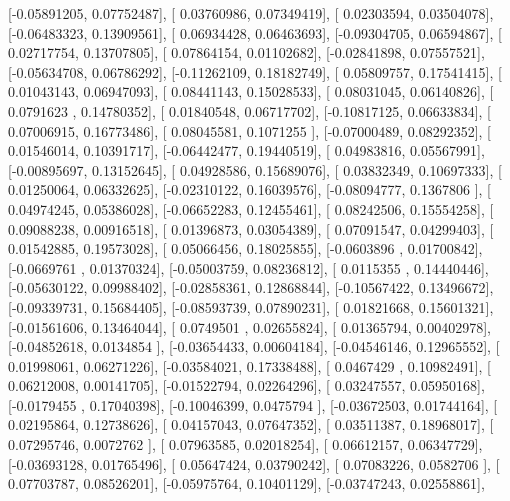 \documentclass{article}
\begin{document}
       [-0.05891205,  0.07752487],
       [ 0.03760986,  0.07349419],
       [ 0.02303594,  0.03504078],
       [-0.06483323,  0.13909561],
       [ 0.06934428,  0.06463693],
       [-0.09304705,  0.06594867],
       [ 0.02717754,  0.13707805],
       [ 0.07864154,  0.01102682],
       [-0.02841898,  0.07557521],
       [-0.05634708,  0.06786292],
       [-0.11262109,  0.18182749],
       [ 0.05809757,  0.17541415],
       [ 0.01043143,  0.06947093],
       [ 0.08441143,  0.15028533],
       [ 0.08031045,  0.06140826],
       [ 0.0791623 ,  0.14780352],
       [ 0.01840548,  0.06717702],
       [-0.10817125,  0.06633834],
       [ 0.07006915,  0.16773486],
       [ 0.08045581,  0.1071255 ],
       [-0.07000489,  0.08292352],
       [ 0.01546014,  0.10391717],
       [-0.06442477,  0.19440519],
       [ 0.04983816,  0.05567991],
       [-0.00895697,  0.13152645],
       [ 0.04928586,  0.15689076],
       [ 0.03832349,  0.10697333],
       [ 0.01250064,  0.06332625],
       [-0.02310122,  0.16039576],
       [-0.08094777,  0.1367806 ],
       [ 0.04974245,  0.05386028],
       [-0.06652283,  0.12455461],
       [ 0.08242506,  0.15554258],
       [ 0.09088238,  0.00916518],
       [ 0.01396873,  0.03054389],
       [ 0.07091547,  0.04299403],
       [ 0.01542885,  0.19573028],
       [ 0.05066456,  0.18025855],
       [-0.0603896 ,  0.01700842],
       [-0.0669761 ,  0.01370324],
       [-0.05003759,  0.08236812],
       [ 0.0115355 ,  0.14440446],
       [-0.05630122,  0.09988402],
       [-0.02858361,  0.12868844],
       [-0.10567422,  0.13496672],
       [-0.09339731,  0.15684405],
       [-0.08593739,  0.07890231],
       [ 0.01821668,  0.15601321],
       [-0.01561606,  0.13464044],
       [ 0.0749501 ,  0.02655824],
       [ 0.01365794,  0.00402978],
       [-0.04852618,  0.0134854 ],
       [-0.03654433,  0.00604184],
       [-0.04546146,  0.12965552],
       [ 0.01998061,  0.06271226],
       [-0.03584021,  0.17338488],
       [ 0.0467429 ,  0.10982491],
       [ 0.06212008,  0.00141705],
       [-0.01522794,  0.02264296],
       [ 0.03247557,  0.05950168],
       [-0.0179455 ,  0.17040398],
       [-0.10046399,  0.0475794 ],
       [-0.03672503,  0.01744164],
       [ 0.02195864,  0.12738626],
       [ 0.04157043,  0.07647352],
       [ 0.03511387,  0.18968017],
       [ 0.07295746,  0.0072762 ],
       [ 0.07963585,  0.02018254],
       [ 0.06612157,  0.06347729],
       [-0.03693128,  0.01765496],
       [ 0.05647424,  0.03790242],
       [ 0.07083226,  0.0582706 ],
       [ 0.07703787,  0.08526201],
       [-0.05975764,  0.10401129],
       [-0.03747243,  0.02558861],
\end{document}
